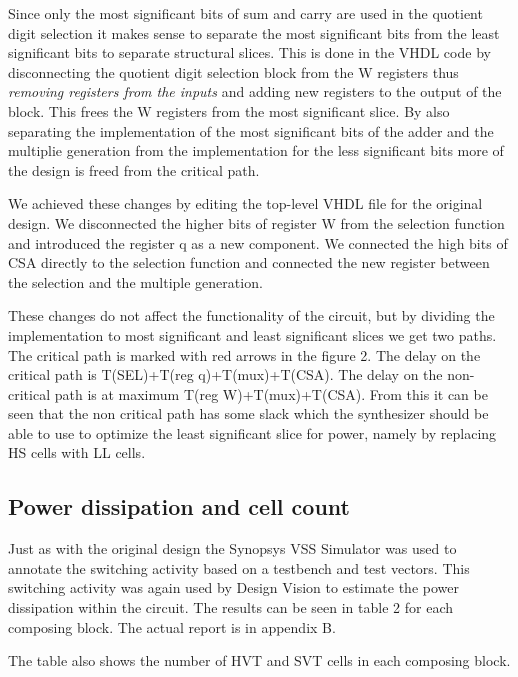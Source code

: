 \documentclass[11pt,a4paper]{article}
\begin{document}
Since only the most significant bits of sum and carry are used in the quotient digit selection it makes sense to separate the most significant bits from the least significant bits to separate structural slices. This is done in the VHDL code by disconnecting the quotient digit selection block from the W registers thus \textit{removing registers from the inputs} and adding new registers to the output of the block. This frees the W registers from the most significant slice. By also separating the implementation of the most significant bits of the adder and the multiplie generation from the implementation for the less significant bits more of the design is freed from the critical path.


We achieved these changes by editing the top-level VHDL file for the original design. We disconnected the higher bits of register W from the selection function and introduced the register q as a new component. We connected the high bits of CSA directly to the selection function and connected the new register between the selection and the multiple generation.

These changes do not affect the functionality of the circuit, but by dividing the implementation to most significant and least significant slices we get two paths. The critical path is marked with red arrows in the figure 2. The delay on the critical path is T(SEL)+T(reg q)+T(mux)+T(CSA). The delay on the non-critical path is at maximum T(reg W)+T(mux)+T(CSA). From this it can be seen that the non critical path has some slack which the synthesizer should be able to use to optimize the least significant slice for power, namely by replacing HS cells with LL cells.

\floatbarrier
\subsection{Power dissipation and cell count}
\floatbarrier
Just as with the original design the Synopsys VSS Simulator was used to annotate the switching activity based on a testbench and test vectors. This switching activity was again used by Design Vision to estimate the power dissipation within the circuit. The results can be seen in table 2 for each composing block. The actual report is in appendix B.

The table also shows the number of HVT and SVT cells in each composing block.
\end{document}
